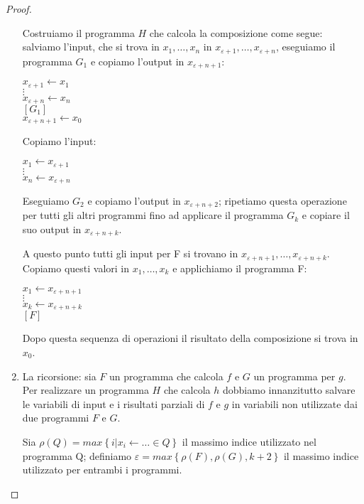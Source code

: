 \begin{proof}
\begin{enumerate}
Costruiamo il programma $H$ che calcola la composizione come segue:
salviamo l'input, che si trova in $x_{1},\dots,x_{n}$ in
$x_{\varepsilon+1},\dots,x_{\varepsilon+n}$, eseguiamo il programma
$G_1$ e copiamo l'output in $x_{\varepsilon+n+1}$:

\begin{mylisting}
$x_{\varepsilon+1}\leftarrow x_{1}$\\
$\vdots$\\
$x_{\varepsilon+n}\leftarrow x_{n}$\\
$[G_{1}]$\\
$x_{\varepsilon+n+1}\leftarrow x_{0}$
\end{mylisting}

Copiamo l'input:
\begin{mylisting}
$x_{1}\leftarrow x_{\varepsilon+1}$\\
$\vdots$\\
$x_{n}\leftarrow x_{\varepsilon+n}$
\end{mylisting}

Eseguiamo $G_{2}$ e copiamo l'output in $x_{\varepsilon+n+2}$;
ripetiamo questa operazione per tutti gli altri programmi fino ad
applicare il programma $G_{k}$ e copiare il suo output in
$x_{\varepsilon+n+k}$.

A questo punto tutti gli input per F si trovano in
$x_{\varepsilon+n+1},\dots,x_{\varepsilon+n+k}$.  Copiamo questi
valori in $x_{1},\dots,x_{k}$ e applichiamo il programma F:

\begin{mylisting}
$x_{1}\leftarrow x_{\varepsilon+n+1}$\\
$\vdots$\\
$x_{k}\leftarrow x_{\varepsilon+n+k}$\\
$[F]$
\end{mylisting}

Dopo questa sequenza di operazioni il risultato della composizione si
trova in $x_{0}$.

\item La ricorsione: sia $F$ un programma che calcola $f$ e $G$ un
  programma per $g$. Per realizzare un programma $H$ che calcola $h$
  dobbiamo innanzitutto salvare le variabili di input e i risultati
  parziali di $f$ e $g$ in variabili non utilizzate dai due programmi
  $F$ e $G$.

  Sia $\rho(Q)=max\left\{ i|x_{i}\leftarrow\dots \in Q\right\}$ il
  massimo indice utilizzato nel programma Q; definiamo
  $\varepsilon=max\left\{ \rho(F),\rho(G),k+2\right\}$ il massimo
  indice utilizzato per entrambi i programmi.


\end{enumerate}
\end{proof}
